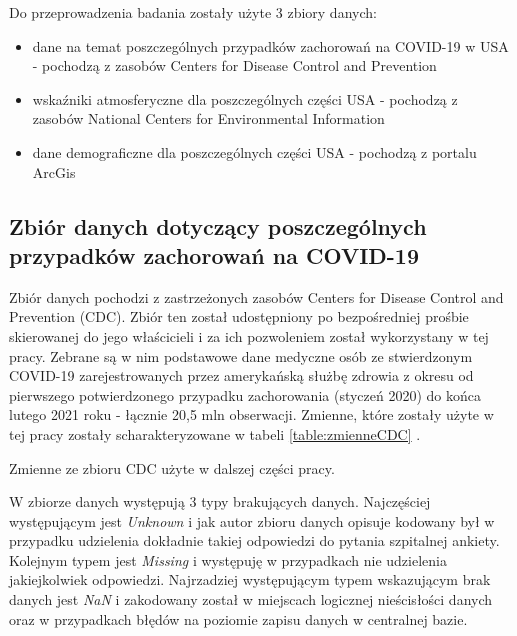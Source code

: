 \documentclass[polish, twoside, 12pt, a4paper]{article}
\theoremstyle{definition}
\theoremstyle{plain}
\theoremstyle{remark}
\begin{document}
Do przeprowadzenia badania zostały użyte 3 zbiory danych: 
\begin{itemize}
  \item dane na temat poszczególnych przypadków zachorowań na COVID-19 w USA - pochodzą z zasobów Centers for Disease Control and Prevention
  \item wskaźniki atmosferyczne dla poszczególnych części USA - pochodzą z zasobów National Centers for Environmental Information
  \item dane demograficzne  dla poszczególnych części USA - pochodzą z portalu ArcGis
\end{itemize}



\subsection{Zbiór danych dotyczący poszczególnych przypadków zachorowań na COVID-19}


Zbiór danych pochodzi z zastrzeżonych zasobów Centers for Disease Control and Prevention (CDC). Zbiór ten został udostępniony po bezpośredniej prośbie skierowanej do jego właścicieli i za ich pozwoleniem został wykorzystany w tej pracy. Zebrane są w nim podstawowe dane medyczne osób ze stwierdzonym COVID-19 zarejestrowanych przez amerykańską służbę zdrowia z okresu od pierwszego potwierdzonego przypadku zachorowania (styczeń 2020) do końca lutego 2021 roku - łącznie 20,5 mln obserwacji. Zmienne, które zostały użyte w tej pracy zostały scharakteryzowane w tabeli \ref{table:zmienneCDC} .

\begin{table}[H]
  \centering
{}
\caption{Zmienne ze zbioru CDC użyte w dalszej części pracy.}
\label{table:zmienneCDC}
\end{table}

W zbiorze danych występują 3 typy brakujących danych. Najczęściej występującym jest \emph{Unknown} i jak autor zbioru danych opisuje kodowany był w przypadku udzielenia dokładnie takiej odpowiedzi do pytania szpitalnej ankiety. Kolejnym typem jest  \emph{Missing} i występuję w przypadkach nie udzielenia jakiejkolwiek odpowiedzi. Najrzadziej występującym typem wskazującym brak danych jest \emph{NaN} i zakodowany został w miejscach logicznej nieścisłości danych oraz w przypadkach błędów na poziomie zapisu danych w centralnej bazie.
\end{document}
